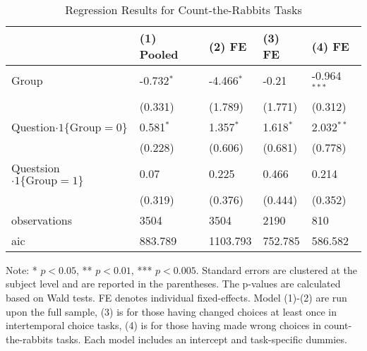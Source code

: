 \documentclass[12pt]{article}
\begin{document}
\begin{table}
    \caption{Regression Results for Count-the-Rabbits Tasks}
    \vspace*{12pt}
    \centering

      \begin{tabular}{lllll}
\hline
 & (1) Pooled & (2) FE & (3) FE & (4) FE \\
\hline
Group & -0.732$^{*}$ & -4.466$^{*}$ & -0.21 & -0.964$^{***}$ \\
 & (0.331) & (1.789) & (1.771) & (0.312) \\
Question$\cdot1\{\text{Group}=0\}$ & 0.581$^{*}$ & 1.357$^{*}$ & 1.618$^{*}$ & 2.032$^{**}$ \\
 & (0.228) & (0.606) & (0.681) & (0.778) \\
Questsion$\cdot1\{\text{Group}=1\}$ & 0.07 & 0.225 & 0.466 & 0.214 \\
 & (0.319) & (0.376) & (0.444) & (0.352) \\\hline

observations & 3504 & 3504 & 2190 & 810 \\
aic & 883.789 & 1103.793 & 752.785 & 586.582 \\
\hline
\end{tabular}

    \vspace*{4pt}
    \centering
    \begin{minipage}{0.85\textwidth}
    {\par\footnotesize Note: * $p<0.05$, ** $p<0.01$, *** $p<0.005$. Standard errors are clustered at the subject level and are reported in the parentheses. The p-values are calculated based on Wald tests. FE denotes individual fixed-effects. Model (1)-(2) are run upon the full sample, (3) is for those having changed choices at least once in intertemporal choice tasks, (4) is for those having made wrong choices in count-the-rabbits tasks. Each model includes an intercept and task-specific dummies. }
    \end{minipage}
    \label{tab:exp3_reg_rabbit_choice}
\end{table}
\end{document}
